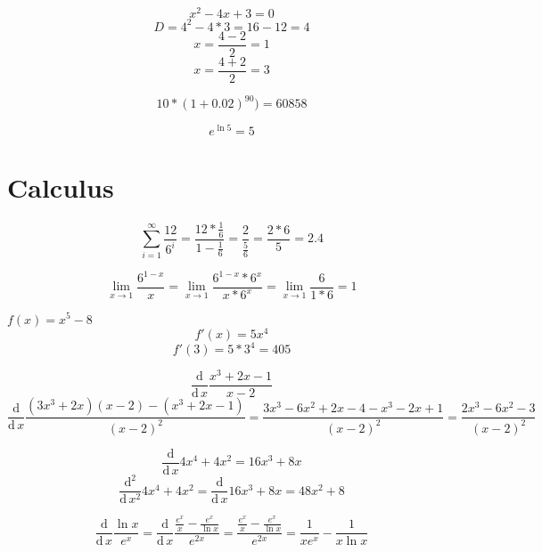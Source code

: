 \documentclass[10pt]{article}
\newenvironment{problem}[2][Problem]{\begin{trivlist}
\item[\hskip \labelsep {\bfseries #1}\hskip \labelsep {\bfseries #2.}]}{\end{trivlist}}
\begin{document}
\begin{problem}{2.3}
$$x^2-4x+3=0$$
$$D=4^2-4*3=16-12=4$$
$$x=\frac{4-2}{2}=1$$
$$x=\frac{4+2}{2}=3$$

\end{problem}

\begin{problem}{2.4}
$$10*(1+0.02)^90)=60858$$
\end{problem}

\begin{problem}{2.5}

$$e^{\ln 5}=5$$
\end{problem}

\section{Calculus}

\begin{problem}{3.1}
$$\sum\limits_{i=1}^{\infty} \frac{12}{6^i}=\frac{12*\frac{1}{6}}{1-\frac{1}{6}}=\frac{2}{\frac{5}{6}}=\frac{2*6}{5}=2.4$$
\end{problem}

\begin{problem}{3.2}
$$\lim\limits_{x \rightarrow 1}\frac{6^{1-x}}{x}=\lim\limits_{x \rightarrow 1}\frac{6^{1-x}*6^x}{x*6^x}=\lim\limits_{x \rightarrow 1}\frac{6}{1*6}=1$$
\end{problem}

\begin{problem}{3.3}
$f(x)=x^5-8$
$$f'(x)=5x^4$$
$$f'(3)=5*3^4=405$$
\end{problem}

\begin{problem}{3.4}
$$\frac{\mathrm{d}}{\mathrm{d}\, x} \frac{x^3+2x-1}{x-2}$$
$$\frac{\mathrm{d}}{\mathrm{d}\, x} \frac{(3x^3+2x)(x-2)-(x^3+2x-1)}{(x-2)^2}=\frac{3x^3-6x^2+2x-4-x^3-2x+1}{(x-2)^2}=\frac{2x^3-6x^2-3}{(x-2)^2}$$
\end{problem}

\begin{problem}{3.5}
$$\frac{\mathrm{d}}{\mathrm{d}\, x} 4x^4+4x^2=16x^3+8x$$
 $$\frac{\mathrm{d^2}}{\mathrm{d}\, x^2} 4x^4+4x^2=\frac{\mathrm{d}}{\mathrm{d}\, x} 16x^3+8x=48x^2+8 $$

 
\end{problem}

\begin{problem}{3.6}

$$\frac{\mathrm{d}}{\mathrm{d}\, x} \frac{\ln x}{e^x}=\frac{\mathrm{d}}{\mathrm{d}\, x} \frac{\frac{e^x}{x}-\frac{e^x}{\ln x}}{e^{2x}}=\frac{\frac{e^x}{x}-\frac{e^x}{\ln{x}}}{e^{2x}}=\frac{1}{xe^x}-\frac{1}{x\ln{x}}$$
\end{problem}
\end{document}
